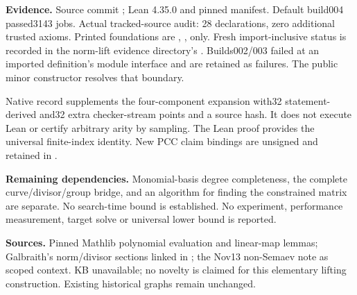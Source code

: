 \documentclass[11pt]{article}
\begin{document}
\textbf{Evidence.} Source commit ; Lean 4.35.0 and pinned
manifest. Default build004 passed3143 jobs. Actual tracked-source audit:
28 declarations, zero additional trusted axioms. Printed foundations are
, ,  only.
Fresh import-inclusive status is recorded in the norm-lift evidence directory's
.
Builds002/003 failed at an imported definition's module interface and are retained
as failures. The public minor constructor resolves that boundary.

Native record  supplements the four-component
expansion with32 statement-derived and32 extra checker-stream points and a source
hash. It does not execute Lean or certify arbitrary arity by sampling. The Lean
proof provides the universal finite-index identity. New PCC claim bindings are
unsigned and retained in .

\textbf{Remaining dependencies.} Monomial-basis degree completeness, the complete
curve/divisor/group bridge, and an algorithm for finding the constrained matrix
are separate. No search-time bound is established. No experiment, performance
measurement, target solve or universal lower bound is reported.

\textbf{Sources.} Pinned Mathlib polynomial evaluation and linear-map lemmas;
Galbraith's norm/divisor sections linked in ; the Nov13
non-Semaev note as scoped context. KB unavailable; no novelty is claimed for
this elementary lifting construction. Existing historical graphs remain unchanged.
\end{document}
